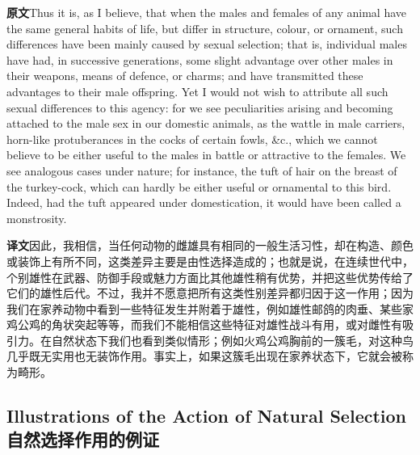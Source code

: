 \documentclass[UTF8,zihao=-4]{ctexart}
\newcommand{\BodyFont}{\fontsize{10.5pt}{15.5pt}\selectfont}
\newcommand{\origlabel}{\textbf{原文}\quad}
\newcommand{\translabel}{\textbf{译文}\quad}
\newenvironment{enblock}{\par\noindent\begingroup\BodyFont\origlabel}{\par\endgroup}
\newenvironment{zhblock}{\par\noindent\begingroup\BodyFont\translabel}{\par\endgroup\vspace{0.35em}}
\newcommand{\pair}[2]{\begin{enblock}#1\end{enblock}\begin{zhblock}#2\end{zhblock}}
\begin{document}
\pair{Thus it is, as I believe, that when the males and females of any animal have the same general habits of life, but differ in structure, colour, or ornament, such differences have been mainly caused by sexual selection; that is, individual males have had, in successive generations, some slight advantage over other males in their weapons, means of defence, or charms; and have transmitted these advantages to their male offspring. Yet I would not wish to attribute all such sexual differences to this agency: for we see peculiarities arising and becoming attached to the male sex in our domestic animals, as the wattle in male carriers, horn-like protuberances in the cocks of certain fowls, \&c., which we cannot believe to be either useful to the males in battle or attractive to the females. We see analogous cases under nature; for instance, the tuft of hair on the breast of the turkey-cock, which can hardly be either useful or ornamental to this bird. Indeed, had the tuft appeared under domestication, it would have been called a monstrosity.}{因此，我相信，当任何动物的雌雄具有相同的一般生活习性，却在构造、颜色或装饰上有所不同，这类差异主要是由性选择造成的；也就是说，在连续世代中，个别雄性在武器、防御手段或魅力方面比其他雄性稍有优势，并把这些优势传给了它们的雄性后代。不过，我并不愿意把所有这类性别差异都归因于这一作用；因为我们在家养动物中看到一些特征发生并附着于雄性，例如雄性邮鸽的肉垂、某些家鸡公鸡的角状突起等等，而我们不能相信这些特征对雄性战斗有用，或对雌性有吸引力。在自然状态下我们也看到类似情形；例如火鸡公鸡胸前的一簇毛，对这种鸟几乎既无实用也无装饰作用。事实上，如果这簇毛出现在家养状态下，它就会被称为畸形。}

\subsection*{Illustrations of the Action of Natural Selection\\自然选择作用的例证}
\end{document}
